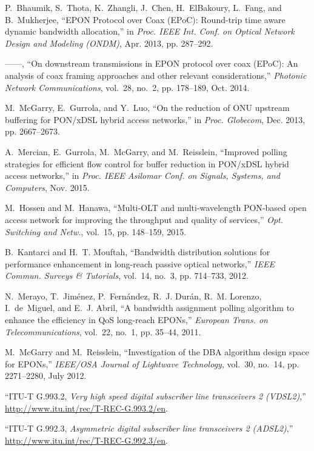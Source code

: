 \documentclass[pdftex,journal]{IEEEtran}
\begin{document}
\begin{thebibliography}{10}
P.~Bhaumik, S.~Thota, K.~Zhangli, J.~Chen, H.~ElBakoury, L.~Fang, and
  B.~Mukherjee, ``{EPON Protocol over Coax (EPoC)}: Round-trip time aware
  dynamic bandwidth allocation,'' in \emph{Proc. IEEE Int. Conf. on Optical
  Network Design and Modeling (ONDM)}, Apr. 2013, pp. 287--292.

------, ``On downstream transmissions in {EPON} protocol over coax {(EPoC)}: An
  analysis of coax framing approaches and other relevant considerations,''
  \emph{Photonic Network Communications}, vol.~28, no.~2, pp. 178--189, Oct.
  2014.

M.~McGarry, E.~Gurrola, and Y.~Luo, ``On the reduction of {ONU} upstream
  buffering for {PON/xDSL} hybrid access networks,'' in \emph{Proc. Globecom},
  Dec. 2013, pp. 2667--2673.

A.~Mercian, E.~Gurrola, M.~McGarry, and M.~Reisslein, ``Improved polling
  strategies for efficient flow control for buffer reduction in {PON/xDSL}
  hybrid access networks,'' in \emph{Proc. IEEE Asilomar Conf. on Signals,
  Systems, and Computers}, Nov. 2015.

M.~Hossen and M.~Hanawa, ``Multi-{OLT} and multi-wavelength {PON}-based open
  access network for improving the throughput and quality of services,''
  \emph{Opt. Switching and Netw.}, vol.~15, pp. 148--159, 2015.

B.~Kantarci and H.~T. Mouftah, ``Bandwidth distribution solutions for
  performance enhancement in long-reach passive optical networks,'' \emph{IEEE
  Commun. Surveys \& Tutorials}, vol.~14, no.~3, pp. 714--733, 2012.

N.~Merayo, T.~Jim{\'e}nez, P.~Fern{\'a}ndez, R.~J. Dur{\'a}n, R.~M. Lorenzo,
  I.~de~Miguel, and E.~J. Abril, ``A bandwidth assignment polling algorithm to
  enhance the efficiency in {QoS} long-reach {EPONs},'' \emph{European Trans.
  on Telecommunications}, vol.~22, no.~1, pp. 35--44, 2011.

M.~McGarry and M.~Reisslein, ``Investigation of the {DBA} algorithm design
  space for {EPONs},'' \emph{IEEE/OSA Journal of Lightwave Technology},
  vol.~30, no.~14, pp. 2271--2280, July 2012.

``{ITU-T G.993.2}, \textit{Very high speed digital subscriber line transceivers
  2 (VDSL2)},'' \url{http://www.itu.int/rec/T-REC-G.993.2/en}.

``{ITU-T G.992.3}, \textit{Asymmetric digital subscriber line transceivers 2
  (ADSL2)},'' \url{http://www.itu.int/rec/T-REC-G.992.3/en}.


\end{thebibliography}
\end{document}

